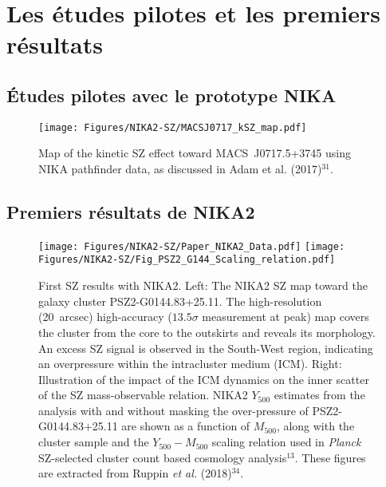 \section{Les études pilotes et les premiers résultats}

\subsection{\'Etudes pilotes avec le prototype NIKA}
{\color{vert}\lipsum[5-7]}

\begin{figure}
  \centering
  \texttt{[image: Figures/NIKA2-SZ/MACSJ0717\_kSZ\_map.pdf]}
  \caption{Map of the kinetic SZ effect toward \mbox{MACS~J0717.5+3745} using NIKA pathfinder data, as discussed in Adam et al. (2017)$^{31}$.}
  \label{fig:nikanika2}
\end{figure}

\subsection{Premiers résultats de NIKA2}
{\color{vert}\lipsum[2-4]}

\begin{figure}
  \centering
  \texttt{[image: Figures/NIKA2-SZ/Paper\_NIKA2\_Data.pdf]}
  \texttt{[image: Figures/NIKA2-SZ/Fig\_PSZ2\_G144\_Scaling\_relation.pdf]}
  \caption{First SZ results with NIKA2. Left: The NIKA2 SZ map toward the galaxy cluster PSZ2-G0144.83+25.11. The high-resolution (20~arcsec) high-accuracy ($13.5\sigma $ measurement at peak) map covers the cluster from the core to the outskirts and reveals its morphology. An excess SZ signal is observed in the South-West region, indicating an overpressure within the intracluster medium (ICM). Right: Illustration of the impact of the ICM dynamics on the inner scatter of the SZ mass-observable relation. NIKA2 $Y_{500}$ estimates from the analysis with and without masking the over-pressure of PSZ2-G0144.83+25.11 are shown as a function of $M_{500}$, along with the cluster sample and the $Y_{500}-M_{500}$ scaling relation used in \emph{Planck} SZ-selected cluster count based cosmology analysis$^{13}$. These figures are extracted from Ruppin {\it et al.} (2018)$^{34}$. }
  \label{fig:nika2-sz}
\end{figure}



%
%
%
%
%
%
%
%
